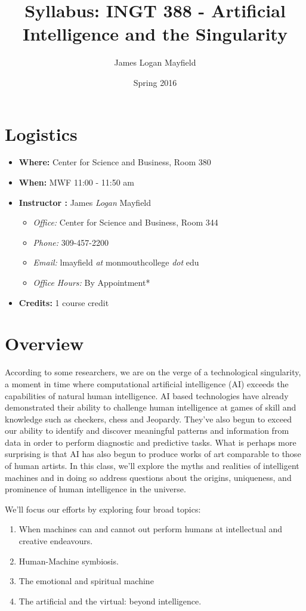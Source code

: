 \documentclass[]{tufte-handout}
\title{Syllabus: INGT 388 - Artificial Intelligence and the Singularity}
\author{James Logan Mayfield }
\date{ Spring 2016 }
\begin{document}
\maketitle

\section{Logistics}
\begin{itemize}
\item \textbf{Where: } Center for Science and Business, Room 380
\item \textbf{When: } MWF 11:00 - 11:50 am
\item \textbf{Instructor :} James \textit{Logan} Mayfield
\begin{itemize}
\item \textit{Office: } Center for Science and Business, Room 344
\item \textit{Phone: } 309-457-2200
\item \textit{Email: } lmayfield \textit{at} monmouthcollege \textit{dot} edu
\item \textit{Office Hours: } By Appointment*
\end{itemize}
\item \textbf{Credits: } 1 course credit
\end{itemize}

\section{Overview}

According to some researchers, we are on the verge of a technological singularity, a moment in time where computational artificial intelligence (AI) exceeds the capabilities of natural human intelligence.  AI based technologies have already demonstrated their ability to challenge human intelligence at games of skill and knowledge such as checkers, chess and Jeopardy. They've also begun to exceed our ability to identify and discover meaningful patterns and information from data in order to perform diagnostic and predictive tasks.  What is perhaps more surprising is that AI has also begun to produce works of art comparable to those of human artists. In this class, we'll explore the myths and realities of intelligent machines and in doing so address questions about the origins, uniqueness, and prominence of human intelligence in the universe.     

We'll focus our efforts by exploring four broad topics:
\begin{enumerate}
\item When machines can and cannot out perform humans at intellectual and creative endeavours.
\item Human-Machine symbiosis. 
\item The emotional and spiritual machine
\item The artificial and the virtual: beyond intelligence.
\end{enumerate}
  
\end{document}
